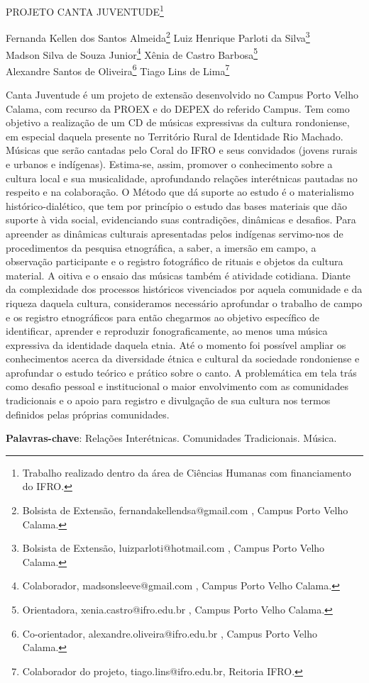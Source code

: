 \documentclass[article,12pt,onesidea,4paper,english,brazil]{abntex2}
\begin{document}
	
	
	\frenchspacing 
	
	\begin{center}
		\LARGE PROJETO CANTA JUVENTUDE\footnote{Trabalho realizado dentro da área de Ciências Humanas com financiamento do IFRO.}
		
		\normalsize
		Fernanda Kellen dos Santos Almeida\footnote{Bolsista de Extensão, fernandakellendsa@gmail.com , Campus Porto Velho Calama.} 
		Luiz Henrique Parloti da Silva\footnote{Bolsista de Extensão, luizparloti@hotmail.com , Campus Porto Velho Calama.} \\
		Madson Silva de Souza Junior\footnote{Colaborador, madsonsleeve@gmail.com , Campus Porto Velho Calama.} 
		Xênia de Castro Barbosa\footnote{Orientadora, xenia.castro@ifro.edu.br , Campus Porto Velho Calama.} \\
		Alexandre Santos de Oliveira\footnote{Co-orientador, alexandre.oliveira@ifro.edu.br , Campus Porto Velho Calama.}
		Tiago Lins de Lima\footnote{ Colaborador do projeto, tiago.lins@ifro.edu.br, Reitoria IFRO.}
	\end{center}
	
	\noindent Canta Juventude é um projeto de extensão desenvolvido no Campus Porto Velho Calama, com recurso da PROEX e do DEPEX do referido Campus. Tem como objetivo a realização de um CD de músicas expressivas da cultura rondoniense, em especial daquela presente no Território Rural de Identidade Rio Machado. Músicas que serão cantadas pelo Coral do IFRO e seus convidados (jovens rurais e urbanos e indígenas). Estima-se, assim, promover o conhecimento sobre a cultura local e sua musicalidade, aprofundando relações interétnicas pautadas no respeito e na colaboração. O Método que dá suporte ao estudo é o materialismo histórico-dialético, que tem por princípio o estudo das bases materiais que dão suporte à vida social, evidenciando suas contradições, dinâmicas e desafios. Para apreender as dinâmicas culturais apresentadas pelos indígenas servimo-nos de procedimentos da pesquisa etnográfica, a saber, a imersão em campo, a observação participante e o registro fotográfico de rituais e objetos da cultura material. A oitiva e o ensaio das músicas também é atividade cotidiana. Diante da complexidade dos processos históricos vivenciados por aquela comunidade e da riqueza daquela cultura, consideramos necessário aprofundar o trabalho de campo e os registro etnográficos para então chegarmos ao objetivo específico de identificar, aprender e reproduzir fonograficamente, ao menos uma música expressiva da identidade daquela etnia. Até o momento foi possível ampliar os conhecimentos acerca da diversidade étnica e cultural da sociedade rondoniense e aprofundar o estudo teórico e prático sobre o canto. A problemática em tela trás como desafio pessoal e institucional o maior envolvimento com as comunidades tradicionais e o apoio para registro e divulgação de sua cultura nos termos definidos pelas próprias comunidades.
	
	\vspace{\onelineskip}
	
	\noindent
	\textbf{Palavras-chave}: Relações Interétnicas. Comunidades Tradicionais. Música.
	
\end{document}
